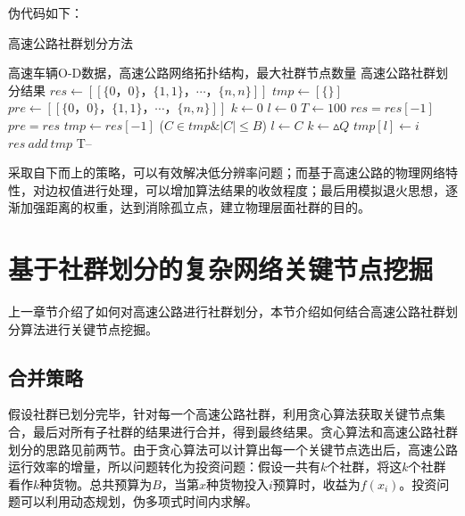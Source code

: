 		伪代码如下：
		\begin{algorithm}[h]
        \caption{高速公路社群划分方法}  
        \label{shequn}
        \begin{algorithmic}[1] %
            \Require 高速车辆O-D数据，高速公路网络拓扑结构，最大社群节点数量
            \Ensure 高速公路社群划分结果
                \State $res\gets [[\{0，0\}，\{1,1\}，\cdots，\{n,n\}]]$ 
                \State $tmp\gets [\{\}]$
                \State $pre\gets [[\{0，0\}，\{1,1\}，\cdots，\{n,n\}]]$ 
                \State $k\gets 0$  
                \State $l\gets 0$
                \State $T\gets 100$  
                	\State $res=res[-1]$
                	\State $pre=res$
	                	\State $tmp\gets res[-1]$  
	                		\For($C \in tmp \& |C| \le B$)
		                        	\State $l\gets C$  
		                        	\State $k\gets {\vartriangle Q}$  
	                    		\EndIf	
	                		\EndFor
	                    	\State $tmp[l] \gets i$ 
	                	\EndFor
	                	\State $res \ add \ tmp$
                	\EndWhile
                	\State T--
                \EndWhile  
                \State {}  
            \EndFunction  
        \end{algorithmic}  
    	\end{algorithm} 

		采取自下而上的策略，可以有效解决低分辨率问题；而基于高速公路的物理网络特性，对边权值进行处理，可以增加算法结果的收敛程度；最后用模拟退火思想，逐渐加强距离的权重，达到消除孤立点，建立物理层面社群的目的。

	\section{基于社群划分的复杂网络关键节点挖掘}
		上一章节介绍了如何对高速公路进行社群划分，本节介绍如何结合高速公路社群划分算法进行关键节点挖掘。

		\subsection{合并策略}
			假设社群已划分完毕，针对每一个高速公路社群，利用贪心算法获取关键节点集合，最后对所有子社群的结果进行合并，得到最终结果。贪心算法和高速公路社群划分的思路见前两节。由于贪心算法可以计算出每一个关键节点选出后，高速公路运行效率的增量，所以问题转化为投资问题：假设一共有$k$个社群，将这$k$个社群看作$k$种货物。总共预算为$B$，当第$x$种货物投入$i$预算时，收益为$f(x_i)$。投资问题可以利用动态规划，伪多项式时间内求解。
